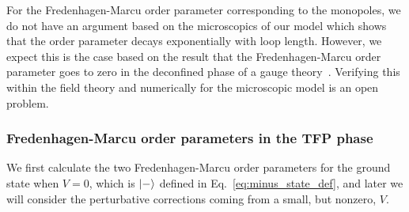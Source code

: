 \documentclass[twocolumn,superscriptaddress,amsmath,amssymb,aps,prx,nofootinbib]{revtex4-2}
\begin{document}
For the Fredenhagen-Marcu order parameter corresponding to the monopoles, we do not have an argument based on the microscopics of our model which shows that the order parameter decays exponentially with loop length. However, we expect this is the case based on the result that the Fredenhagen-Marcu order parameter goes to zero in the deconfined phase of a gauge theory~\cite{fredenhagen1983charged, fredenhagen1986, fredenhagen1988dual}. Verifying this within the field theory and numerically for the microscopic model is an open problem.

\subsubsection{Fredenhagen-Marcu order parameters in the TFP phase} \label{sec:FM_tfp}

We first calculate the two Fredenhagen-Marcu order parameters for the ground state when $V = 0$, which is $\ket{-}$ defined in Eq.~\eqref{eq:minus_state_def}, and later we will consider the perturbative corrections coming from a small, but nonzero, $V$.
\end{document}
